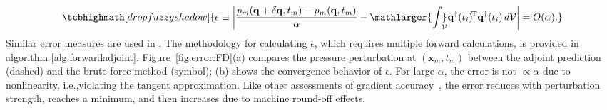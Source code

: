 \begin{equation}\label{eq:error:FD}
\tcbhighmath[drop fuzzy shadow]{\epsilon \equiv\left| \frac{p_m (\mathbf{q}+\delta\mathbf{q},t_m)-p_m(\mathbf{q},t_m)}{\alpha}-{\mathlarger{\int}}_{\!\!\!\!\mathcal{V}} \mathbf{q}^\dagger(t_i)^{\!\mathrm{T}} {\mathbf{q}}^\dagger(t_i)\,d\mathcal{V}\right|=O(\alpha).}
\end{equation}
Similar error measures are used in \cite{vishnampet2015practical,buchta2016discrete}. The methodology for calculating $\epsilon$, which requires multiple forward calculations, is provided in algorithm \ref{alg:forwardadjoint}. Figure~\ref{fig:error:FD}(a) compares the pressure perturbation at $(\mathbf{x}_m,t_m)$ between the adjoint prediction (dashed) and the brute-force method (symbol); (b) shows the convergence behavior of $\epsilon$. For large $\alpha$, the error is not $\propto \alpha$ due to nonlinearity, i.e.,violating the tangent approximation.  Like other assessments of gradient accuracy~\cite{vishnampet2015practical,buchta2016discrete,wang2019discrete}, the error reduces with perturbation strength, reaches a minimum, and then increases due to machine round-off effects.  

